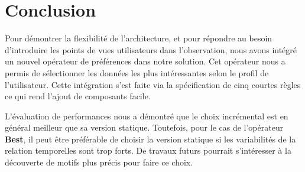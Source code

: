 \section{Conclusion}
Pour démontrer la flexibilité de l'architecture, et pour répondre au besoin d'introduire les points de vues utilisateurs dans l'observation, nous avons intégré un nouvel opérateur de préférences dans notre solution. Cet opérateur nous a permis de sélectionner les données les plus intéressantes selon le profil de l'utilisateur. Cette intégration s'est faite via la spécification de cinq courtes règles ce qui rend l'ajout de composants facile.

L'évaluation de performances nous a démontré que le choix incrémental est en général meilleur que sa version statique. Toutefois, pour le cas de l'opérateur \textbf{Best}, il peut être préférable de choisir la version statique si les variabilités de la relation temporelles sont trop forts. De travaux futurs pourrait s'intéresser à la découverte de motifs plus précis pour faire ce choix.
